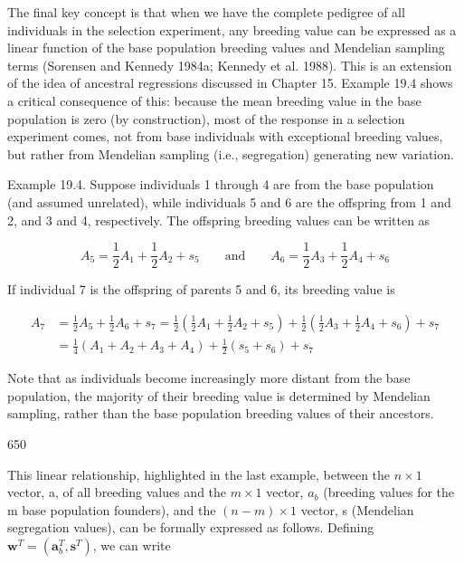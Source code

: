 \documentclass{article}
\begin{document}
The final key concept is that when we have the complete pedigree of all individuals in the selection experiment, any breeding value can be expressed as a linear function of the base population breeding values and Mendelian sampling terms (Sorensen and Kennedy 1984a; Kennedy et al. 1988). This is an extension of the idea of ancestral regressions discussed in Chapter 15. Example 19.4 shows a critical consequence of this: because the mean breeding value in the base population is zero (by construction), most of the response in a selection experiment comes, not from base individuals with exceptional breeding values, but rather from Mendelian sampling (i.e., segregation) generating new variation.

Example 19.4. Suppose individuals 1 through 4 are from the base population (and assumed unrelated), while individuals 5 and 6 are the offspring from 1 and 2, and 3 and 4, respectively. The offspring breeding values can be written as

\begin{equation}
A_{5}=\frac{1}{2}A_{1}+\frac{1}{2}A_{2}+s_{5}\qquad\mathrm{a n d}\qquad A_{6}=\frac{1}{2}A_{3}+\frac{1}{2}A_{4}+s_{6}
\end{equation}

If individual 7 is the offspring of parents 5 and 6, its breeding value is

\begin{equation}
\begin{aligned}A_{7}&=\frac{1}{2}A_{5}+\frac{1}{2}A_{6}+s_{7}=\frac{1}{2}\left(\frac{1}{2}A_{1}+\frac{1}{2}A_{2}+s_{5}\right)+\frac{1}{2}\left(\frac{1}{2}A_{3}+\frac{1}{2}A_{4}+s_{6}\right)+s_{7}\\&=\frac{1}{4}\left(A_{1}+A_{2}+A_{3}+A_{4}\right)+\frac{1}{2}\left(s_{5}+s_{6}\right)+s_{7}\end{aligned}
\end{equation}

Note that as individuals become increasingly more distant from the base population, the majority of their breeding value is determined by Mendelian sampling, rather than the base population breeding values of their ancestors.

650

This linear relationship, highlighted in the last example, between the  $ n \times 1 $ vector, a, of all breeding values and the  $ m \times 1 $ vector,  $ a_b $ (breeding values for the m base population founders), and the  $ (n - m) \times 1 $ vector, s (Mendelian segregation values), can be formally expressed as follows. Defining  $ \mathbf{w}^T = (\mathbf{a}_b^T, \mathbf{s}^T) $, we can write
\end{document}
